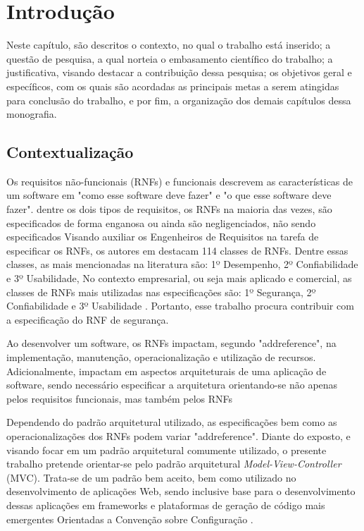 \chapter{Introdução}

Neste capítulo, são descritos o contexto, no qual o trabalho está inserido; a questão de pesquisa, a qual norteia o embasamento científico do trabalho;  a justificativa, visando destacar a contribuição dessa pesquisa; os objetivos geral e específicos, com os quais são acordadas as principais metas a serem atingidas para conclusão do trabalho, e por fim, a organização dos demais capítulos dessa monografia.

\section{Contextualização}

Os requisitos não-funcionais (RNFs) e funcionais descrevem as características de um software em "como esse software deve fazer" e "o que esse software deve fazer". \cite{sommerville1997requirements} dentre os dois tipos de requisitos, os RNFs na maioria das vezes, são especificados de forma enganosa ou ainda são negligenciados, não sendo especificados \cite{eckhardt2016non}  Visando auxiliar os Engenheiros de Requisitos na tarefa de especificar os RNFs, os autores em \cite{mairiza2010investigation} destacam 114 classes de RNFs. Dentre essas classes, as mais mencionadas na literatura são: 1º Desempenho, 2º Confiabilidade e  3º Usabilidade, No contexto empresarial, ou seja mais aplicado e comercial, as classes de RNFs mais utilizadas nas especificações são: 1º Segurança, 2º Confiabilidade e 3º Usabilidade \cite{eckhardt2016non}. Portanto, esse trabalho procura contribuir com a especificação do RNF de segurança.

Ao desenvolver um software, os RNFs impactam, segundo "addreference", na implementação, manutenção, operacionalização e utilização de recursos. Adicionalmente, impactam em aspectos arquiteturais de uma aplicação de software, sendo necessário especificar a arquitetura orientando-se não apenas pelos requisitos funcionais, mas também pelos RNFs \cite{buschmann1996system}

Dependendo do padrão arquitetural utilizado, as especificações bem como as operacionalizações dos RNFs podem variar "addreference". Diante do exposto, e visando focar em um padrão arquitetural comumente utilizado, o presente trabalho pretende orientar-se pelo padrão arquitetural \textit{Model-View-Controller} (MVC). Trata-se de um padrão bem aceito, bem como utilizado no desenvolvimento de aplicações Web, sendo inclusive base para o desenvolvimento dessas aplicações em frameworks e plataformas de geração de código mais emergentes Orientadas a Convenção sobre Configuração \cite{jailia2016behavior}.


